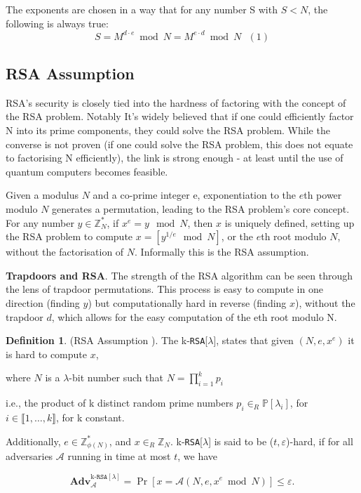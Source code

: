 \documentclass[]{final_report}
\theoremstyle{definition}
\newtheorem{definition}{Definition}[chapter]
\begin{document}
The exponents are chosen in a way that for any number S with $S < N$, the following is always true:
\[S = M^{d \cdot e} \bmod N = M^{e \cdot d} \bmod N \text{ } (1)\]

\subsection{RSA Assumption}
\label{subSec:RSA-ASS}
RSA's security is closely tied into the hardness of factoring with the concept of the RSA problem. Notably It's widely believed that if one could efficiently factor N into its prime components, they could solve the RSA problem. While the converse is not proven (if one could solve the RSA problem, this does not equate to factorising N efficiently), the link is strong enough - at least until the use of quantum computers becomes feasible.

Given a modulus \(N\) and a co-prime integer e, exponentiation to the \(e\)th power modulo \(N\) generates a permutation, leading to the RSA problem's core concept. For any number \(y \in \mathbb{Z}^*_{N}\), if \(x^e = y \mod N\), then \(x\) is uniquely defined, setting up the RSA problem to compute \(x = [y^{1/e} \mod N]\), or the \(e\)th root modulo \(N\), without the factorisation of \(N\). Informally this is the RSA assumption.

\textbf{Trapdoors and RSA}. The strength of the RSA algorithm can be seen through the lens of trapdoor permutations. This process is easy to compute in one direction (finding \(y\)) but computationally hard in reverse (finding \(x\)), without the trapdoor \(d\), which allows for the easy computation of the eth root modulo N.

\begin{definition}
\label{def:RSA-ASS}
(RSA Assumption \cite{10.1145/359340.359342}). The k-\texttt{RSA}[$\lambda$], states that given $(N, e, x^e)$ it is hard to compute $x$, 

where $N$ is a $\lambda$-bit number such that $N = \displaystyle\prod_{i=1}^{k} p_i$ 

i.e., the product of k distinct random prime numbers $p_i \in_{R} \mathbb{P}[\lambda_i]$, for $i \in \llbracket1, \ldots, k \rrbracket$, for k constant. 

Additionally, $e \in \mathbb{Z}_{\phi(N)}^{*}$, and $x \in_R \mathbb{Z}_N$. k-\texttt{RSA}[$\lambda$] is said to be ($t, \varepsilon$)-hard, if for all adversaries $ \mathcal{A}$ running in time at most $t$, we have

\[ \textbf{Adv}_ \mathcal{A}^{\text{k-}\texttt{RSA}[\lambda]} = \Pr [x =  \mathcal{A}(N, e, x^e \bmod N) ] \leq \varepsilon. \]
\end{definition}
\end{document}
